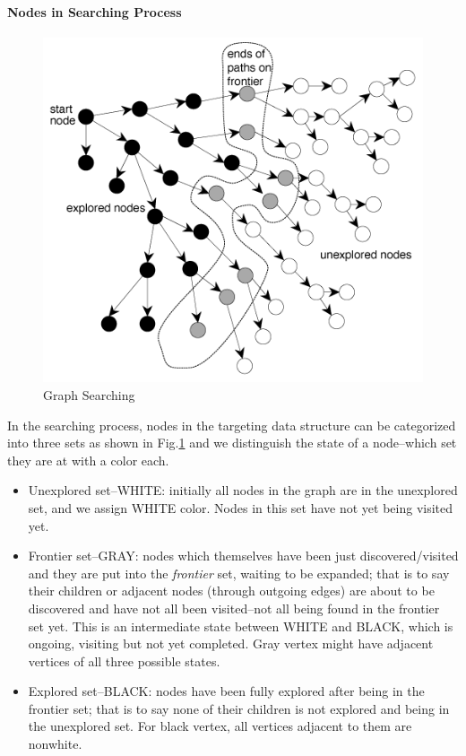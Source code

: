 \documentclass[main.tex]{subfiles}
\begin{document}
\paragraph{Nodes in Searching Process}
\begin{figure}[!ht]
    \centering
     \includegraphics[width=0.9\columnwidth]{fig/searchsp.png}
    \caption{Graph Searching}
    \label{fig:search_sp}
\end{figure}
In the searching process, nodes in the targeting data structure can be categorized into three sets as shown in Fig.\ref{fig:search_sp} and we distinguish the state of a node--which set they are at with a color each.
\begin{itemize}
   \item Unexplored set--WHITE: initially all nodes in the graph are in the unexplored set, and we assign WHITE color. Nodes in this set have not yet being visited yet. 
    \item Frontier set--GRAY: nodes which themselves have been just discovered/visited and they are put into the \textit{frontier} set,  waiting to be expanded; that is to say their children or adjacent nodes (through outgoing edges) are about to be discovered and have not all been visited--not all being found in the frontier set yet. This is an intermediate state between WHITE and BLACK, which is ongoing, visiting but not yet completed. Gray vertex might have adjacent vertices of all three possible states.
    \item Explored set--BLACK: nodes have been fully explored after being in the frontier set; that is to say none of their children is not explored and being in the unexplored set. For black vertex, all vertices adjacent to them are nonwhite.%
 
\end{itemize}
\end{document}
